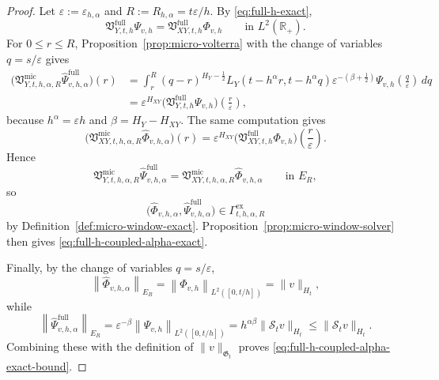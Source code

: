 \documentclass[11pt,a4paper]{amsart}
\theoremstyle{plain}
\theoremstyle{definition}
\theoremstyle{remark}
\newcommand{\R}{\mathbb{R}}
\begin{document}
\begin{proof}
Let \(\varepsilon:=\varepsilon_{h,\alpha}\) and \(R:=R_{h,\alpha}=t\varepsilon/h\). By
\eqref{eq:full-h-exact},
\[
\mathfrak V_{Y,t,h}^{\mathrm{full}}\Psi_{v,h}
=
\mathfrak V_{XY,t,h}^{\mathrm{full}}\Phi_{v,h}
\qquad\text{in }L^2(\R_+).
\]
For \(0\le r\le R\), Proposition~\ref{prop:micro-volterra} with the change of variables
\(q=s/\varepsilon\) gives
\begin{align*}
\bigl(
\mathfrak V_{Y,t,h,\alpha,R}^{\mathrm{mic}}
\widehat\Psi_{v,h,\alpha}^{\mathrm{full}}
\bigr)(r)
&=
\int_r^{R}
(q-r)^{H_Y-\frac12}
L_Y(t-h^\alpha r,t-h^\alpha q)
\varepsilon^{-(\beta+\frac12)}
\Psi_{v,h}\!\left(\frac{q}{\varepsilon}\right)\,dq\\
&=
\varepsilon^{H_{XY}}
\bigl(
\mathfrak V_{Y,t,h}^{\mathrm{full}}\Psi_{v,h}
\bigr)\!\left(\frac{r}{\varepsilon}\right),
\end{align*}
because \(h^\alpha=\varepsilon h\) and \(\beta=H_Y-H_{XY}\). The same computation gives
\[
\bigl(
\mathfrak V_{XY,t,h,\alpha,R}^{\mathrm{mic}}
\widehat\Phi_{v,h,\alpha}
\bigr)(r)
=
\varepsilon^{H_{XY}}
\bigl(
\mathfrak V_{XY,t,h}^{\mathrm{full}}\Phi_{v,h}
\bigr)\!\left(\frac{r}{\varepsilon}\right).
\]
Hence
\[
\mathfrak V_{Y,t,h,\alpha,R}^{\mathrm{mic}}
\widehat\Psi_{v,h,\alpha}^{\mathrm{full}}
=
\mathfrak V_{XY,t,h,\alpha,R}^{\mathrm{mic}}
\widehat\Phi_{v,h,\alpha}
\qquad\text{in }E_R,
\]
so
\[
\bigl(
\widehat\Phi_{v,h,\alpha},
\widehat\Psi_{v,h,\alpha}^{\mathrm{full}}
\bigr)
\in
\Gamma_{t,h,\alpha,R}^{\mathrm{ex}}
\]
by Definition~\ref{def:micro-window-exact}. Proposition~\ref{prop:micro-window-solver} then gives
\eqref{eq:full-h-coupled-alpha-exact}.

Finally, by the change of variables \(q=s/\varepsilon\),
\[
\left\|
\widehat\Phi_{v,h,\alpha}
\right\|_{E_R}
=
\left\|
\Phi_{v,h}
\right\|_{L^2([0,t/h])}
=
\|v\|_{H_t},
\]
while
\[
\left\|
\widehat\Psi_{v,h,\alpha}^{\mathrm{full}}
\right\|_{E_R}
=
\varepsilon^{-\beta}
\left\|
\Psi_{v,h}
\right\|_{L^2([0,t/h])}
=
h^{\alpha\beta}\|\mathcal S_t v\|_{H_t}
\le
\|\mathcal S_t v\|_{H_t}.
\]
Combining these with the definition of \(\|v\|_{\mathfrak G_t}\) proves
\eqref{eq:full-h-coupled-alpha-exact-bound}.
\end{proof}
\end{document}

